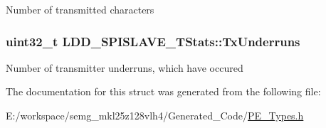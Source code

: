 Number of transmitted characters \hypertarget{struct_l_d_d___s_p_i_s_l_a_v_e___t_stats_ab2e5342f4a486b20ae9306f451451a77}{
\subsubsection[{Tx\-Underruns}]{\setlength{\rightskip}{0pt plus 5cm}uint32\-\_\-t L\-D\-D\-\_\-\-S\-P\-I\-S\-L\-A\-V\-E\-\_\-\-T\-Stats\-::\-Tx\-Underruns}}\label{struct_l_d_d___s_p_i_s_l_a_v_e___t_stats_ab2e5342f4a486b20ae9306f451451a77}
Number of transmitter underruns, which have occured 

The documentation for this struct was generated from the following file\-:\begin{DoxyCompactItemize}
\item 
E\-:/workspace/semg\-\_\-mkl25z128vlh4/\-Generated\-\_\-\-Code/\hyperlink{_p_e___types_8h}{P\-E\-\_\-\-Types.\-h}\end{DoxyCompactItemize}
